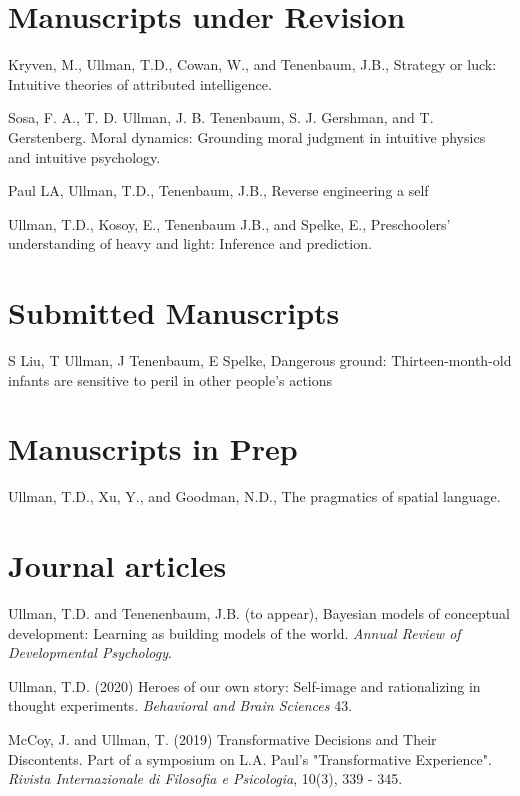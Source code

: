 \documentclass[margin,line,pifont,palatino,courier]{res}
\begin{document}
\begin{resume}
\begin{adjustwidth*}{-3.3cm}{-2cm}
\end{adjustwidth*}

\section{\sc Manuscripts under Revision}

Kryven, M., Ullman, T.D., Cowan, W., and Tenenbaum, J.B., Strategy or luck: Intuitive theories of attributed intelligence.

Sosa, F. A., T. D. Ullman, J. B. Tenenbaum, S. J. Gershman, and T. Gerstenberg. Moral dynamics: Grounding moral judgment in intuitive physics and intuitive psychology.

Paul LA, Ullman, T.D., Tenenbaum, J.B., Reverse engineering a self

Ullman, T.D., Kosoy, E., Tenenbaum J.B., and Spelke, E., Preschoolers' understanding of heavy and light: Inference and prediction. 

\section{\sc Submitted Manuscripts}

S Liu, T Ullman, J Tenenbaum, E Spelke, Dangerous ground: Thirteen-month-old infants are sensitive to peril in other people's actions

\section{\sc Manuscripts in Prep}
Ullman, T.D., Xu, Y., and Goodman, N.D., The pragmatics of spatial language. 

\section{\sc Journal articles}

Ullman, T.D. and Tenenenbaum, J.B. (to appear), Bayesian models of conceptual development: Learning as building models of the world. \textit{Annual Review of Developmental Psychology}.


Ullman, T.D. (2020) Heroes of our own story: Self-image and rationalizing in thought experiments. \textit{Behavioral and Brain Sciences} 43.

McCoy, J. and Ullman, T. (2019) Transformative Decisions and Their Discontents. Part of a symposium on L.A. Paul's "Transformative Experience". \textit{Rivista Internazionale di Filosofia e Psicologia}, 10(3), 339 - 345.


\end{resume}
\end{document}

